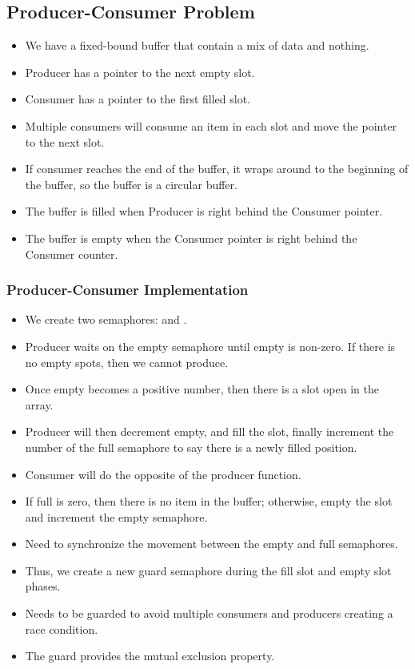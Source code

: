 \documentclass[]{article}
\begin{document}
\subsection{Producer-Consumer Problem}
\begin{itemize}
\item We have a fixed-bound buffer that contain a mix of data and nothing.
\item Producer has a pointer to the next empty slot.
\item Consumer has a pointer to the first filled slot.
\item Multiple consumers will consume an item in each slot and move the pointer
to the next slot.
\item If consumer reaches the end of the buffer, it wraps around to the
beginning of the buffer, so the buffer is a circular buffer.
\item The buffer is filled when Producer is right behind the Consumer pointer.
\item The buffer is empty when the Consumer pointer is right behind the Consumer
counter.
\end{itemize}

\subsubsection{Producer-Consumer Implementation}
\begin{itemize}
\item We create two semaphores:  and .
\item Producer waits on the empty semaphore until empty is non-zero. If there is
no empty spots, then we cannot produce.
\item Once empty becomes a positive number, then there is a slot open in the
array.
\item Producer will then decrement empty, and fill the slot, finally increment
the number of the full semaphore to say there is a newly filled position.
\item Consumer will do the opposite of the producer function.
\item If full is zero, then there is no item in the buffer; otherwise, empty the
slot and increment the empty semaphore.
\item Need to synchronize the movement between the empty and full semaphores.
\item Thus, we create a new guard semaphore during the fill slot and empty slot
phases.
\item Needs to be guarded to avoid multiple consumers and producers creating a
race condition.
\item The guard provides the mutual exclusion property.
\end{itemize}
\end{document}
